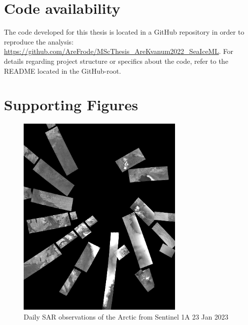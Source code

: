 \documentclass[../main/thesis.tex]{subfiles}
\begin{document}
\section{Code availability}
The code developed for this thesis is located in a GitHub repository in order to reproduce the analysis: \\
\url{https://github.com/AreFrode/MScThesis_AreKvanum2022_SeaIceML}.
For details regarding project structure or specifics about the code, refer to the README located in the GitHub-root.

\newpage

\section{Supporting Figures}

\begin{figure}[h]
    \centering
    \includegraphics[width=0.725\textwidth]{dailysar}
    \caption{\label{fig:S-sar}Daily SAR observations of the Arctic from Sentinel 1A 23 Jan 2023}
\end{figure}
\end{document}
